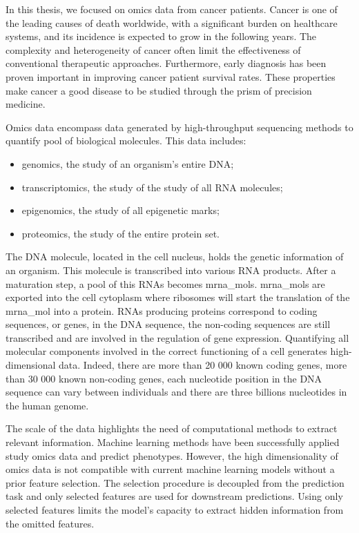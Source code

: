 \documentclass[../main.tex]{subfiles}
\begin{document}
 In this thesis, we focused on omics data from cancer patients.
 Cancer is one of the leading causes of death worldwide, with a significant burden on healthcare systems, and its incidence is expected to grow in the following years.
 The complexity and heterogeneity of cancer often limit the effectiveness of conventional therapeutic approaches.
 Furthermore, early diagnosis has been proven important in improving cancer patient survival rates.
 These properties make cancer a good disease to be studied through the prism of precision medicine.

 Omics data encompass data generated by high-throughput sequencing methods to quantify pool of biological molecules.
 This data includes:
 \begin{itemize}[nosep]
	 \item genomics, the study of an organism's entire DNA;
	 \item transcriptomics, the study of the study of all RNA molecules;
	 \item epigenomics, the study of all epigenetic marks;
	 \item proteomics, the study of the entire protein set.
 \end{itemize}
 The DNA molecule, located in the cell nucleus, holds the genetic information of an organism. 
 This molecule is transcribed into various RNA products.
 After a maturation step, a pool of this RNAs becomes \glspl{mrna_mol}. 
 \Glspl{mrna_mol} are exported into the cell cytoplasm where ribosomes will start the translation of the \gls{mrna_mol} into a protein. 
 RNAs producing proteins correspond to coding sequences, or genes,  in the DNA sequence, the non-coding sequences are still transcribed and are involved in the regulation of gene expression. 
 Quantifying all molecular components involved in the correct functioning of a cell generates high-dimensional data. 
 Indeed, there are more than 20 000 known coding genes, more than 30 000 known non-coding genes, each nucleotide position in the DNA sequence can vary between individuals and there are three billions nucleotides in the human genome. 

 The scale of the data highlights the need of computational methods to extract relevant information. 
 Machine learning methods have been successfully applied study omics data and predict phenotypes. 
 However, the high dimensionality of omics data is not compatible with current machine learning models without a prior feature selection. 
 The selection procedure is decoupled from the prediction task and only selected features are used for downstream predictions.
 Using only selected features limits the model's capacity to extract hidden information from the omitted features. 
 
\end{document}
